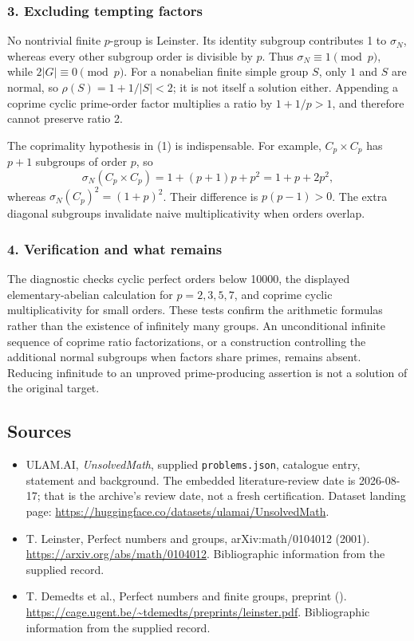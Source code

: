 \documentclass[11pt,a4paper]{article}
\begin{document}
\subsubsection{3. Excluding tempting factors}
No nontrivial finite $p$-group is Leinster. Its identity subgroup contributes 1 to $\sigma_N$, whereas every other subgroup order is divisible by $p$. Thus $\sigma_N\equiv1\pmod p$, while $2|G|\equiv0\pmod p$. For a nonabelian finite simple group $S$, only $1$ and $S$ are normal, so $\rho(S)=1+1/|S|<2$; it is not itself a solution either. Appending a coprime cyclic prime-order factor multiplies a ratio by $1+1/p>1$, and therefore cannot preserve ratio 2.

The coprimality hypothesis in (1) is indispensable. For example, $C_p\times C_p$ has $p+1$ subgroups of order $p$, so
\[\sigma_N(C_p\times C_p)=1+(p+1)p+p^2=1+p+2p^2,
\]
whereas $\sigma_N(C_p)^2=(1+p)^2$. Their difference is $p(p-1)>0$. The extra diagonal subgroups invalidate naive multiplicativity when orders overlap.

\subsubsection{4. Verification and what remains}
The diagnostic checks cyclic perfect orders below 10000, the displayed elementary-abelian calculation for $p=2,3,5,7$, and coprime cyclic multiplicativity for small orders. These tests confirm the arithmetic formulas rather than the existence of infinitely many groups. An unconditional infinite sequence of coprime ratio factorizations, or a construction controlling the additional normal subgroups when factors share primes, remains absent. Reducing infinitude to an unproved prime-producing assertion is not a solution of the original target.

\subsection{Sources}

{\small

\begin{itemize}

\item[\hypertarget{source:statement:1}{S1}] ULAM.AI, \emph{UnsolvedMath}, supplied \texttt{problems.json}, catalogue entry, statement and background. The embedded literature-review date is 2026-08-17; that is the archive’s review date, not a fresh certification. Dataset landing page: \url{https://huggingface.co/datasets/ulamai/UnsolvedMath}.

\item[\hypertarget{source:statement:2}{S2}] T. Leinster, Perfect numbers and groups, arXiv:math/0104012 (2001). \url{https://arxiv.org/abs/math/0104012}. Bibliographic information from the supplied record.

\item[\hypertarget{source:statement:3}{S3}] T. Demedts et al., Perfect numbers and finite groups, preprint (). \url{https://cage.ugent.be/~tdemedts/preprints/leinster.pdf}. Bibliographic information from the supplied record.

\end{itemize}

}

\label{end:statement}
\end{document}
